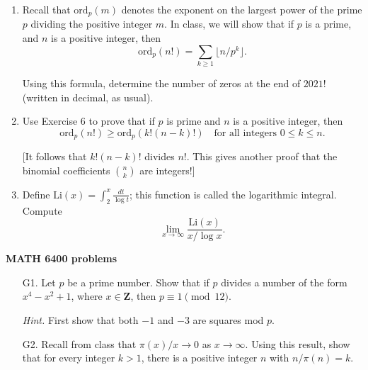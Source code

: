 \documentclass[12pt]{article}
\def\Z{\mathbf{Z}}
\def\ord{\mathrm{ord}}
\begin{document}
\begin{enumerate}
    
\item Recall that $\ord_p(m)$ denotes the exponent on the largest power of the prime $p$ dividing the positive integer $m$. In class, we will show that if $p$ is a prime, and $n$ is a positive integer, then
\[ \ord_p(n!) = \sum_{k\ge 1} \lfloor n/p^k\rfloor. \]

Using this formula, determine the number of zeros at the end of $2021!$ (written in decimal, as usual).

\item Use Exercise 6 to prove that if $p$ is prime and $n$ is a positive integer, then
\[ \ord_p(n!) \ge \ord_p(k! (n-k)!)\quad\text{for all integers $0\le k \le n$}. \]

{\scriptsize [It follows that $k! (n-k)!$ divides $n!$. This gives another proof that the binomial coefficients $\binom{n}{k}$ are integers!]}

\item Define $\mathrm{Li}(x) = \int_{2}^{x} \frac{dt}{\log{t}}$; this function is called the \textsf{logarithmic integral}. Compute
\[ \lim_{x\to\infty} \frac{\mathrm{Li}(x)}{x/\log{x}}. \]

\end{enumerate}
 
\vskip 10pt \noindent\textbf{MATH 6400 problems}
\begin{enumerate}
\item[G1.] Let $p$ be a prime number. Show that if $p$ divides a number of the form $x^4 - x^2 + 1$, where
$x \in \Z$, then $p\equiv 1\pmod{12}$.

{\scriptsize \emph{Hint.} First show that both $-1$ and $-3$ are squares mod $p$.}

\item[G2.] Recall from class that $\pi(x)/x\to 0$ as $x\to\infty$. Using this result, show that for every integer $k>1$, there is a positive integer $n$ with $n/\pi(n)=k$.
\end{enumerate}
 
\end{document}
